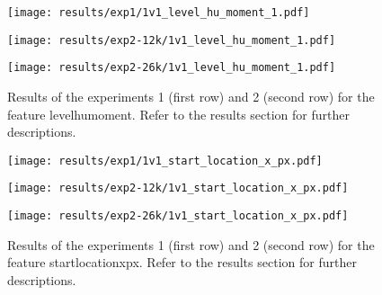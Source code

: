  
\begin{figure}[h!]
    \centering
	\begin{minipage}{0.3\linewidth}
		\texttt{[image: results/exp1/1v1\_level\_hu\_moment\_1.pdf]}
	\end{minipage}

	\begin{minipage}{0.3\linewidth}
		\texttt{[image: results/exp2-12k/1v1\_level\_hu\_moment\_1.pdf]}
	\end{minipage}
	\begin{minipage}{0.3\linewidth}
		\texttt{[image: results/exp2-26k/1v1\_level\_hu\_moment\_1.pdf]}
	\end{minipage}

	\caption[ Results: Feature level\textunderscore hu\textunderscore moment]{ Results of the experiments 1 (first row) and 2 (second row) for the feature level\textunderscore hu\textunderscore moment. Refer to the results section for further descriptions. }
	\label{fig:appendix_level_hu_moment_1}
\end{figure}
 
\begin{figure}[h!]
    \centering
	\begin{minipage}{0.3\linewidth}
		\texttt{[image: results/exp1/1v1\_start\_location\_x\_px.pdf]}
	\end{minipage}

	\begin{minipage}{0.3\linewidth}
		\texttt{[image: results/exp2-12k/1v1\_start\_location\_x\_px.pdf]}
	\end{minipage}
	\begin{minipage}{0.3\linewidth}
		\texttt{[image: results/exp2-26k/1v1\_start\_location\_x\_px.pdf]}
	\end{minipage}

	\caption[ Results: Feature start\textunderscore location\textunderscore x\textunderscore px]{ Results of the experiments 1 (first row) and 2 (second row) for the feature start\textunderscore location\textunderscore x\textunderscore px. Refer to the results section for further descriptions. }
	\label{fig:appendix_start_location_x_px}
\end{figure}
 \newpage 

